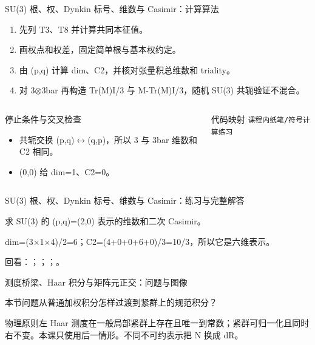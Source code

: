 \begin{frame}[t]{SU(3) 根、权、Dynkin 标号、维数与 Casimir：计算算法}
\footnotesize
{}\begin{enumerate}
\item 先列 T3、T8 并计算共同本征值。
\item 画权点和权差，固定简单根与基本权约定。
\item 由 (p,q) 计算 dim、C2，并核对张量积总维数和 triality。
\item 对 3\ensuremath{\otimes}3bar 再构造 Tr(M)I/\allowbreak{}3 与 M-Tr(M)I/\allowbreak{}3，随机 SU(3) 共轭验证不混合。
\end{enumerate}\begin{columns}[T,onlytextwidth]
\begin{block}{停止条件与交叉检查}\scriptsize\begin{itemize}
\item[\CheckMark] 共轭交换 (p,q)\ensuremath{\leftrightarrow}(q,p)，所以 3 与 3bar 维数和 C2 相同。
\item[\CheckMark] (0,0) 给 dim=1、C2=0。
\end{itemize}\end{block}
\begin{block}{代码映射}
\scriptsize \texttt{课程内纸笔/\allowbreak{}符号计算练习}
\end{block}\end{columns}\end{frame}

\begin{frame}[t]{SU(3) 根、权、Dynkin 标号、维数与 Casimir：练习与完整解答}
\footnotesize
\begin{block}{}求 SU(3) 的 (p,q)=(2,0) 表示的维数和二次 Casimir。\end{block}
\begin{exampleblock}{}dim=(3\ensuremath{\times}1\ensuremath{\times}4)/\allowbreak{}2=6；C2=(4+0+0+6+0)/\allowbreak{}3=10/\allowbreak{}3，所以它是六维表示。\end{exampleblock}
\vfill
\scriptsize 回看：；；；。
\end{frame}

\begin{frame}[t]{测度桥梁、Haar 积分与矩阵元正交：问题与图像}
\footnotesize
\begin{block}{本节问题}从普通加权积分怎样过渡到紧群上的规范积分？\end{block}
\begin{block}{物理原则}\quad 左 Haar 测度在一般局部紧群上存在且唯一到常数；紧群可归一化且同时右不变。本课只使用后一情形。不同不可约表示把 N 换成 dR。\end{block}
\end{frame}

